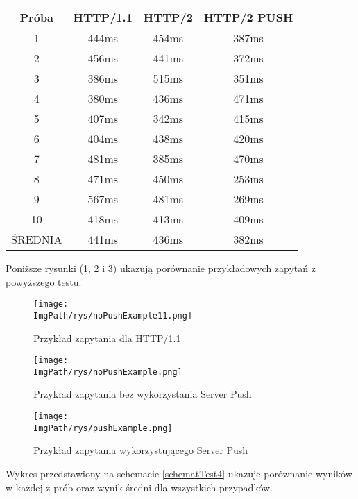 \documentclass[a4paper,12pt,twoside,openany]{report}
\newcommand{\ImgPath}{.}
\begin{document}
\begin{tabular}{c|c|c|c}
Próba & HTTP/1.1 & HTTP/2 & HTTP/2 PUSH \\ \hline
1 & 444ms & 454ms & 387ms \\
2 & 456ms & 441ms & 372ms \\
3 & 386ms & 515ms & 351ms \\
4 & 380ms & 436ms & 471ms \\
5 & 407ms & 342ms & 415ms \\
6 & 404ms & 438ms & 420ms \\
7 & 481ms & 385ms & 470ms \\
8 & 471ms & 450ms & 253ms \\
9 & 567ms & 481ms & 269ms \\
10 & 418ms & 413ms & 409ms \\ \hline
ŚREDNIA & 441ms & 436ms & 382ms \\
\end{tabular}

Poniższe rysunki (\ref{schematNoPushExample11}, \ref{schematNoPushExample} i \ref{schematPushExample}) ukazują porównanie przykładowych zapytań z powyższego testu.

\begin{figure}[!htbp]
	\begin{center}
\centering
\texttt{[image: \\ImgPath/rys/noPushExample11.png]}
\end{center}
	\caption{Przykład zapytania dla HTTP/1.1}
	\label{schematNoPushExample11}
\end{figure}

\begin{figure}[!htbp]
	\begin{center}
\centering
\texttt{[image: \\ImgPath/rys/noPushExample.png]}
\end{center}
	\caption{Przykład zapytania bez wykorzystania Server Push}
	\label{schematNoPushExample}
\end{figure}

\begin{figure}[!htbp]
	\begin{center}
\centering
\texttt{[image: \\ImgPath/rys/pushExample.png]}
\end{center}
	\caption{Przykład zapytania wykorzystującego Server Push}
	\label{schematPushExample}
\end{figure}

Wykres przedstawiony na schemacie \ref{schematTest4} ukazuje porównanie wyników w każdej z prób oraz wynik średni dla wszystkich przypadków.
\end{document}

